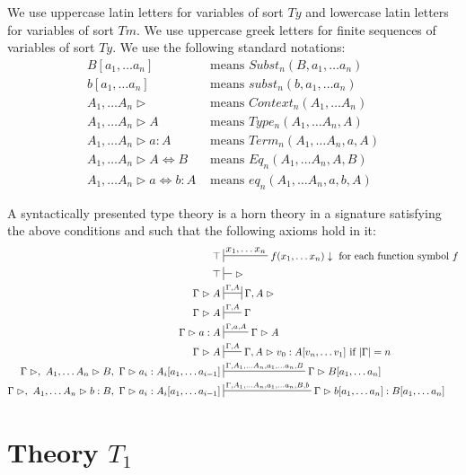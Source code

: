 \documentclass{amsart}
\theoremstyle{definition}
\theoremstyle{remark}
\newcommand{\deq}{\Leftrightarrow}
\newcommand{\ttvdash}{\vartriangleright}
\numberwithin{figure}{section}
\begin{document}
We use uppercase latin letters for variables of sort $Ty$ and lowercase latin letters for variables of sort $Tm$.
We use uppercase greek letters for finite sequences of variables of sort $Ty$.
We use the following standard notations:
\begin{align*}
B[a_1, \ldots a_n] & \text{ means } Subst_n(B, a_1, \ldots a_n) \\
b[a_1, \ldots a_n] & \text{ means } subst_n(b, a_1, \ldots a_n) \\
A_1, \ldots A_n \ttvdash & \text{ means } Context_n(A_1, \ldots A_n) \\
A_1, \ldots A_n \ttvdash A & \text{ means } Type_n(A_1, \ldots A_n, A) \\
A_1, \ldots A_n \ttvdash a : A & \text{ means } Term_n(A_1, \ldots A_n, a, A) \\
A_1, \ldots A_n \ttvdash A \deq B & \text{ means } Eq_n(A_1, \ldots A_n, A, B) \\
A_1, \ldots A_n \ttvdash a \deq b : A & \text{ means } eq_n(A_1, \ldots A_n, a, b, A)
\end{align*}

A syntactically presented type theory is a horn theory in a signature satisfying the above conditions and such that the following axioms hold in it:
\begin{align*}
\top & \sststile[d]{}{x_1, \ldots x_n} f(x_1, \ldots x_n) \downarrow \text{ for each function symbol $f$} \\
\top & \sststile[d]{}{} \ \ttvdash \\
\Gamma \ttvdash A & \ssststile{}{\Gamma, A} \Gamma, A \ttvdash \\
\Gamma \ttvdash A & \sststile{}{\Gamma, A} \Gamma \\
\Gamma \ttvdash a : A & \sststile{}{\Gamma, a, A} \Gamma \ttvdash A \\
\Gamma \ttvdash A & \sststile{}{\Gamma, A} \Gamma, A \ttvdash v_0 : A[v_n, \ldots v_1] \text{ if } |\Gamma| = n \\
\Gamma \ttvdash,\ A_1, \ldots A_n \ttvdash B,\ \Gamma \ttvdash a_i : A_i[a_1, \ldots a_{i-1}] & \sststile{}{\Gamma, A_1, \ldots A_n, a_1, \ldots a_n, B} \Gamma \ttvdash B[a_1, \ldots a_n] \\
\Gamma \ttvdash,\ A_1, \ldots A_n \ttvdash b : B,\ \Gamma \ttvdash a_i : A_i[a_1, \ldots a_{i-1}] & \sststile{}{\Gamma, A_1, \ldots A_n, a_1, \ldots a_n, B, b} \Gamma \ttvdash b[a_1, \ldots a_n] : B[a_1, \ldots a_n]
\end{align*}

\section{Theory $T_1$}
\end{document}
